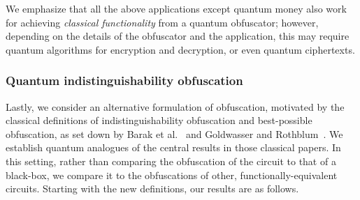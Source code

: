 \documentclass[envcountsame]{llncs}
\numberwithin{equation}{section}
\begin{document}
We emphasize that all the above applications except quantum money also work for achieving \emph{classical functionality} from a quantum obfuscator; however, depending on the details of the obfuscator and the application, this may require quantum algorithms for encryption and decryption, or even quantum ciphertexts.


\subsubsection{Quantum indistinguishability obfuscation}

Lastly, we consider an alternative formulation of obfuscation, motivated by the classical definitions of indistinguishability obfuscation and best-possible obfuscation, as set down by Barak et al.~\cite{BGIRSVY12} and Goldwasser and Rothblum~\cite{GR07}. We establish quantum analogues of the central results in those classical papers. In this setting, rather than comparing the obfuscation of the circuit to that of a black-box, we compare it to the obfuscations of other, functionally-equivalent circuits. Starting with the new definitions, our results are as follows.
\end{document}
